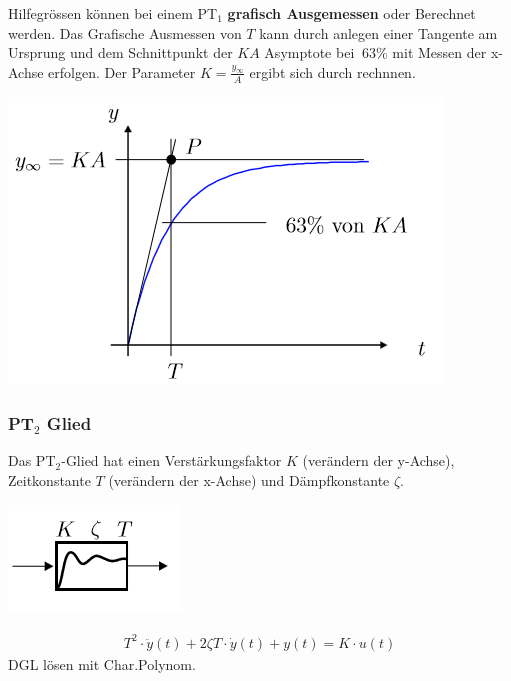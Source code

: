 Hilfegrössen können bei einem PT$_1$ \textbf{grafisch Ausgemessen} oder Berechnet werden. Das Grafische Ausmessen von $T$ kann durch anlegen einer Tangente am Ursprung und dem Schnittpunkt der $KA$ Asymptote bei $~63\%$ mit Messen der x-Achse erfolgen. Der Parameter $K = \frac{y_\infty}{A}$ ergibt sich durch rechnnen.
\begin{center}
	\includegraphics[width=0.6\columnwidth]{Images/pt1_graph}
\end{center}

\subsubsection{PT$_2$ Glied}
Das PT$_2$-Glied hat einen Verstärkungsfaktor $K$ (verändern der y-Achse), Zeitkonstante $T$ (verändern der x-Achse) und Dämpfkonstante $\zeta$.

\begin{center}
	\begin{minipage}{0.20\textwidth}
		\begin{center}
			\includegraphics[width=0.5\linewidth,keepaspectratio=true]{Images/pt2glied}\\
		\end{center}
	\end{minipage}%
	\begin{minipage}{0.3\textwidth}
		\begin{align*}
			T^2 \cdot \ddot{y}(t) + 2\zeta T \cdot \dot{y}(t) + y(t) = K \cdot u(t)
		\end{align*}
		DGL lösen mit Char.Polynom.
	\end{minipage}
\end{center}

